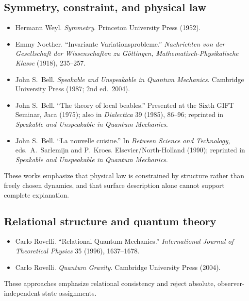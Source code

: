 \documentclass[11pt,twoside,openright]{book}
\begin{document}
\medskip

\subsection*{Symmetry, constraint, and physical law}

\begin{itemize}
  \setlength{\itemsep}{0.2em}
  \setlength{\parskip}{0pt}
  \item Hermann Weyl. \emph{Symmetry}. Princeton University Press (1952).
  \item Emmy Noether. ``Invariante Variationsprobleme.'' \emph{Nachrichten von der Gesellschaft der Wissenschaften zu G\"ottingen, Mathematisch-Physikalische Klasse} (1918), 235--257.
  \item John S.\ Bell. \emph{Speakable and Unspeakable in Quantum Mechanics}. Cambridge University Press (1987; 2nd ed.\ 2004).
  \item John S.\ Bell. ``The theory of local beables.'' Presented at the Sixth GIFT Seminar, Jaca (1975); also in \emph{Dialectica} 39 (1985), 86--96; reprinted in \emph{Speakable and Unspeakable in Quantum Mechanics}.
  \item John S.\ Bell. ``La nouvelle cuisine.'' In \emph{Between Science and Technology}, eds.\ A.\ Sarlemijn and P.\ Kroes. Elsevier/North-Holland (1990); reprinted in \emph{Speakable and Unspeakable in Quantum Mechanics}.
\end{itemize}

\noindent
These works emphasize that physical law is constrained by structure rather than
freely chosen dynamics, and that surface description alone cannot support
complete explanation.

\medskip

\subsection*{Relational structure and quantum theory}

\begin{itemize}
  \setlength{\itemsep}{0.2em}
  \setlength{\parskip}{0pt}
  \item Carlo Rovelli. ``Relational Quantum Mechanics.'' \emph{International Journal of Theoretical Physics} 35 (1996), 1637--1678.
  \item Carlo Rovelli. \emph{Quantum Gravity}. Cambridge University Press (2004).
\end{itemize}

\noindent
These approaches emphasize relational consistency and reject absolute,
observer-independent state assignments.
\end{document}
